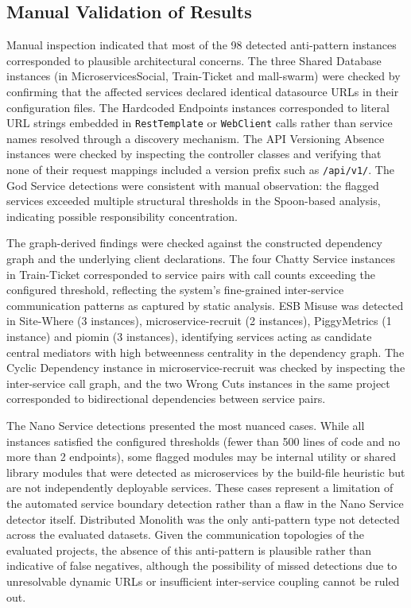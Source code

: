 \subsection{Manual Validation of Results}
\label{sec:manual-validation}

\par Manual inspection indicated that most of the 98 detected anti-pattern instances corresponded to plausible architectural concerns. The three Shared Database instances (in MicroservicesSocial, Train-Ticket and mall-swarm) were checked by confirming that the affected services declared identical datasource URLs in their configuration files. The Hardcoded Endpoints instances corresponded to literal URL strings embedded in \texttt{RestTemplate} or \texttt{WebClient} calls rather than service names resolved through a discovery mechanism. The API Versioning Absence instances were checked by inspecting the controller classes and verifying that none of their request mappings included a version prefix such as \texttt{/api/v1/}. The God Service detections were consistent with manual observation: the flagged services exceeded multiple structural thresholds in the Spoon-based analysis, indicating possible responsibility concentration.

\par The graph-derived findings were checked against the constructed dependency graph and the underlying client declarations. The four Chatty Service instances in Train-Ticket corresponded to service pairs with call counts exceeding the configured threshold, reflecting the system's fine-grained inter-service communication patterns as captured by static analysis. ESB Misuse was detected in Site-Where (3 instances), microservice-recruit (2 instances), PiggyMetrics (1 instance) and piomin (3 instances), identifying services acting as candidate central mediators with high betweenness centrality in the dependency graph. The Cyclic Dependency instance in microservice-recruit was checked by inspecting the inter-service call graph, and the two Wrong Cuts instances in the same project corresponded to bidirectional dependencies between service pairs.

\par The Nano Service detections presented the most nuanced cases. While all instances satisfied the configured thresholds (fewer than 500 lines of code and no more than 2 endpoints), some flagged modules may be internal utility or shared library modules that were detected as microservices by the build-file heuristic but are not independently deployable services. These cases represent a limitation of the automated service boundary detection rather than a flaw in the Nano Service detector itself. Distributed Monolith was the only anti-pattern type not detected across the evaluated datasets. Given the communication topologies of the evaluated projects, the absence of this anti-pattern is plausible rather than indicative of false negatives, although the possibility of missed detections due to unresolvable dynamic URLs or insufficient inter-service coupling cannot be ruled out.

